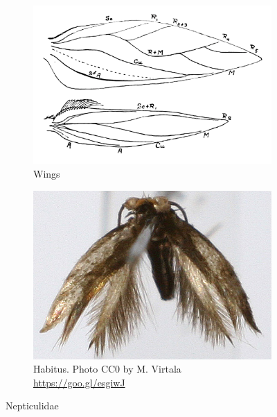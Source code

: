\documentclass[letterpaper, 11pt]{article}
\begin{document}
\begin{figure}[ht!]
    \centering
    \begin{subfigure}[ht!]{0.4\textwidth}
        \includegraphics[width=\textwidth]{NepticulidWings}
        \caption{Wings \citep[][Fig. 1]{braun1917nepticulids}}
        \label{fig:nepticulid2}
    \end{subfigure}
    \qquad %
    \begin{subfigure}[ht!]{0.45\textwidth}
        \includegraphics[width=\textwidth]{nepticulid1}
        \caption{Habitus. Photo CC0 by M. Virtala \url{https://goo.gl/esgiwJ}}
        \label{fig:nepticulid1}
    \end{subfigure}
    \caption{Nepticulidae}\label{fig:nepticulids}
\end{figure}
\end{document}
